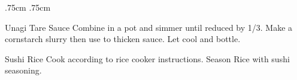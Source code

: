 \documentclass[]{article}
\title{}
\author{}
\begin{document}
\RecipeWidths{\textwidth}{3cm}{0.5cm}{5cm} {.75cm} {.75cm}

\begin{recipe}{Unagi Tare Sauce}{}{}	
	Combine in a pot and simmer until reduced by 1/3. 
	Make a cornstarch slurry then use to thicken sauce. Let cool and bottle. 
\end{recipe}

\begin{recipe}{Sushi Rice}{}{}	
	Cook according to rice cooker instructions. Season Rice with sushi seasoning. 	
\end{recipe}
\end{document}
